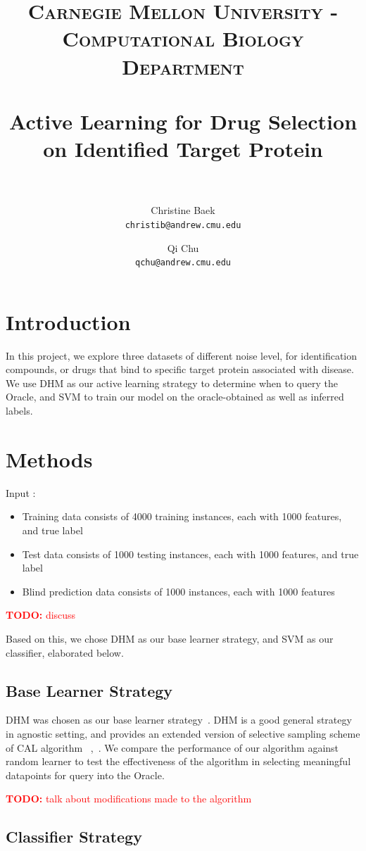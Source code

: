 \documentclass[paper=a4, fontsize=11pt]{scrartcl}
\title{
    \usefont{OT1}{bch}{b}{n}
    \normalfont \normalsize \textsc{Carnegie Mellon University - Computational Biology Department} \\ [25pt]
    \horrule{0.5pt} \\[0.4cm]
    \huge Active Learning for Drug Selection\\ on Identified Target Protein \\
    \horrule{2pt} \\[0.5cm]
}
\author{
  Christine Baek\\
  \normalsize\texttt{christib@andrew.cmu.edu}
  \and
  Qi Chu\\
  \normalsize\texttt{qchu@andrew.cmu.edu}
  \date{}
}
\date{}
\numberwithin{equation}{section}    %
\numberwithin{figure}{section}      %
\numberwithin{table}{section}       %
\newcommand{\TODO}[1]{\textcolor{red}{\textbf{TODO: } #1}}
\numberwithin{equation}{section}    %
\numberwithin{figure}{section}      %
\numberwithin{table}{section}       %
\begin{document}
\maketitle
\section{Introduction}
In this project, we explore three datasets of different noise level, for identification compounds, or drugs that bind to specific target protein associated with disease. We use DHM as our active learning strategy to determine when to query the Oracle, and SVM to train our model on the oracle-obtained as well as inferred labels. 



\section{Methods}

Input :
\begin{itemize}
\item Training data consists of 4000 training instances, each with 1000 features, and true label 
\item Test data consists of 1000 testing instances, each with 1000 features, and true label
\item Blind prediction data consists of 1000 instances, each with 1000 features
\end{itemize}

\TODO{discuss ~\cite{ref:warmuth}}

Based on this, we chose DHM as our base learner strategy, and SVM as our classifier, elaborated below.

\subsection{Base Learner Strategy}

DHM was chosen as our base learner strategy~\cite{ref:dhm}. DHM is a good general strategy in agnostic setting, and provides an extended version of selective sampling scheme of CAL algorithm ~\cite{ref:cal},~\cite{ref:dhm}. We compare the performance of our algorithm against random learner to test the effectiveness of the algorithm in selecting meaningful datapoints for query into the Oracle.

\TODO{talk about modifications made to the algorithm}
\subsection{Classifier Strategy}
\end{document}
